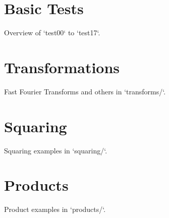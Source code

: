 \section{Basic Tests}
Overview of `test00` to `test17`.

\section{Transformations}
Fast Fourier Transforms and others in `transforms/`.

\section{Squaring}
Squaring examples in `squaring/`.

\section{Products}
Product examples in `products/`.
